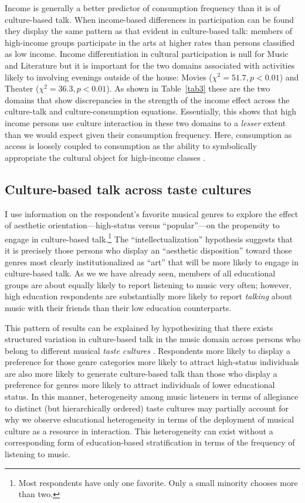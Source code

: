 \documentclass[11pt]{article}
\begin{document}
Income is generally a better predictor of consumption frequency than it is of culture-based talk.  When income-based differences in participation can be found they display the same pattern as that evident in culture-based talk: members of high-income groups participate in the arts at higher rates than persons classified as low income.  Income differentiation in cultural participation is null for Music and Literature but it is important for the two domains associated with activities likely to involving evenings outside of the house: Movies ($\chi^{2}=51.7, p<0.01$) and Theater ($\chi^{2}=36.3, p<0.01$).  As shown in Table~\ref{tab3} these are the two domains that show discrepancies in the strength of the income effect across the culture-talk and culture-consumption equations.  Essentially, this shows that high income persons use culture interaction in these two domains to a \emph{lesser} extent than we would expect given their consumption frequency.  Here, consumption as access is loosely coupled to consumption as the ability to symbolically appropriate the cultural object for high-income classes \citep{bourdieu84}.

\subsection{Culture-based talk across taste cultures}
I use information on the respondent's favorite musical genres to explore the effect of aesthetic orientation---high-status versus ``popular''---on the propensity to engage in culture-based talk.\footnote{Most respondents have only one favorite. Only a small minority chooses more than two.}  The ``intellectualization'' hypothesis suggests that it is precisely those persons who display an  ``aesthetic disposition'' \citep[3]{bourdieu84} toward those genres most clearly institutionalized as ``art'' that will be more likely to engage in culture-based talk.  As we we have already seen, members of all educational groups are about equally likely to report listening to music very often; however, high education respondents are substantially more likely to report \emph{talking} about music with their friends than their low education counterparts. 

This pattern of results can be explained by hypothesizing that there exists structured variation in culture-based talk in the music domain across persons who belong to different musical \emph{taste cultures} \citep{gans99}.  Respondents more likely to display a preference for those genre categories more likely to attract high-status individuals are also more likely to generate culture-based talk than those who display a preference for genres more likely to attract individuals of lower educational status. In this manner, heterogeneity among music listeners in terms of allegiance to distinct (but hierarchically ordered) taste cultures may partially account for why we observe educational heterogeneity in terms of the deployment of musical culture as a resource in interaction.  This heterogeneity can exist without a corresponding form of education-based stratification in terms of the frequency of listening to music. 
\end{document}
